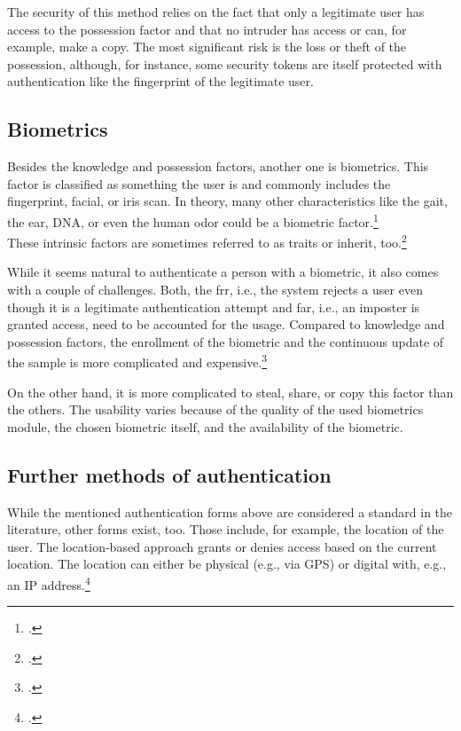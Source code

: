 The security of this method relies on the fact that only a legitimate user has access to the possession factor and that no intruder has access or can, for example, make a copy. The most significant risk is the loss or theft of the possession, although, for instance, some security tokens are itself protected with authentication like the fingerprint of the legitimate user.

\subsection{Biometrics}

Besides the knowledge and possession factors, another one is biometrics. This factor is classified as \frqq something the user is\flqq{} and commonly includes the fingerprint, facial, or iris scan. In theory, many other characteristics like the gait, the ear, DNA, or even the human odor could be a biometric factor.\footcite[See][30--34]{Jain2011}\\
These intrinsic factors are sometimes referred to as traits or inherit, too.\footcite[See][186]{dasgupta2017multi}

While it seems natural to authenticate a person with a biometric, it also comes with a couple of challenges. Both, the \gls{frr}, i.e., the system rejects a user even though it is a legitimate authentication attempt and \gls{far}, i.e., an imposter is granted access, need to be accounted for the usage. Compared to knowledge and possession factors, the enrollment of the biometric and the continuous update of the sample is more complicated and expensive.\footcite[See][18--24]{Jain2011}

On the other hand, it is more complicated to steal, share, or copy this factor than the others. The usability varies because of the quality of the used biometrics module, the chosen biometric itself, and the availability of the biometric.

\subsection{Further methods of authentication}

While the mentioned authentication forms above are considered a standard in the literature, other forms exist, too. Those include, for example, the location of the user. The location-based approach grants or denies access based on the current location. The location can either be physical (e.g., via GPS) or digital with, e.g., an IP address.\footcite{6296127}

